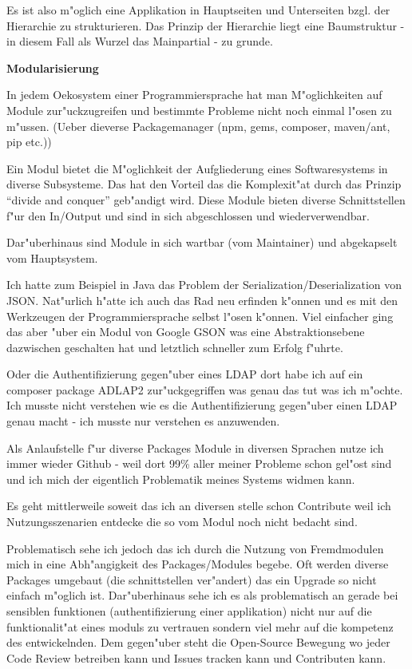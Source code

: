 Es ist also m"oglich eine Applikation in Hauptseiten und Unterseiten bzgl. der Hierarchie zu strukturieren.
Das Prinzip der Hierarchie liegt eine Baumstruktur - in diesem Fall als Wurzel das Mainpartial - zu grunde.

\newpage
\textbf{Modularisierung}

In jedem Oekosystem einer Programmiersprache hat man M"oglichkeiten auf Module zur"uckzugreifen und bestimmte Probleme nicht noch einmal l"osen zu m"ussen. (Ueber dieverse Packagemanager (npm, gems, composer, maven/ant, pip etc.))

Ein Modul bietet die M"oglichkeit der Aufgliederung eines Softwaresystems in diverse Subsysteme. Das hat den Vorteil das die Komplexit"at durch das Prinzip ``divide and conquer'' geb"andigt wird.
Diese Module bieten diverse Schnittstellen f"ur den In/Output und sind in sich abgeschlossen und wiederverwendbar.

Dar"uberhinaus sind Module in sich wartbar (vom Maintainer) und abgekapselt vom Hauptsystem.

Ich hatte zum Beispiel in Java das Problem der Serialization/Deserialization von JSON.
Nat"urlich h"atte ich auch das Rad neu erfinden k"onnen und es mit den Werkzeugen der Programmiersprache selbst l"osen k"onnen.
Viel einfacher ging das aber "uber ein Modul von Google GSON was eine Abstraktionsebene dazwischen geschalten hat und letztlich schneller zum Erfolg f"uhrte.

Oder die Authentifizierung gegen"uber eines LDAP dort habe ich auf ein composer package ADLAP2 zur"uckgegriffen was genau das tut was ich m"ochte. Ich musste nicht verstehen wie es die Authentifizierung gegen"uber einen LDAP genau macht - ich musste nur verstehen es anzuwenden.

Als Anlaufstelle f"ur diverse Packages Module in diversen Sprachen nutze ich immer wieder Github - weil dort 99\% aller meiner Probleme schon gel"ost sind und ich mich der eigentlich Problematik meines Systems widmen kann.

Es geht mittlerweile soweit das ich an diversen stelle schon Contribute weil ich Nutzungsszenarien entdecke die so vom Modul noch nicht bedacht sind.

Problematisch sehe ich jedoch das ich durch die Nutzung von Fremdmodulen mich in eine Abh"angigkeit des Packages/Modules begebe. Oft werden diverse Packages umgebaut (die schnittstellen ver"andert) das ein Upgrade so nicht einfach m"oglich ist.
Dar"uberhinaus sehe ich es als problematisch an gerade bei sensiblen funktionen (authentifizierung einer applikation) nicht nur auf die funktionalit"at eines moduls zu vertrauen sondern viel mehr auf die kompetenz des entwickelnden.
Dem gegen"uber steht die Open-Source Bewegung wo jeder Code Review betreiben kann und Issues tracken kann und Contributen kann.

